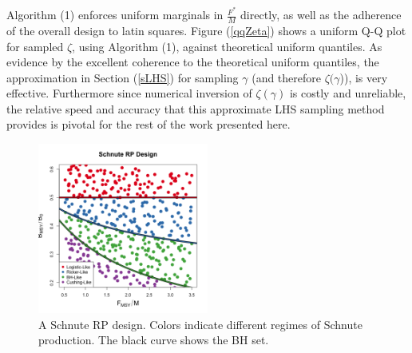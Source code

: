 %
Algorithm (1) enforces uniform marginals in $\frac{F^*}{M}$ directly, as well
as the adherence of the overall design to latin squares.
Figure (\ref{qqZeta}) shows a uniform Q-Q plot for sampled $\zeta$, using
Algorithm (1), against theoretical uniform quantiles. As evidence by the
excellent coherence to the theoretical uniform quantiles, the approximation
in Section (\ref{sLHS}) for sampling $\gamma$ (and therefore $\zeta(\gamma$)),
is very effective.
Furthermore since numerical inversion of $\zeta(\gamma)$ is costly and
unreliable, the relative speed and accuracy that this approximate LHS sampling
method provides is pivotal for the rest of the work presented here. %

%
\begin{figure}
\vspace{-0.5cm}
\includegraphics[width=0.5\textwidth]{../ddBias/designLineColorHHardFlatT30N150WWideN112.png}
\vspace{-1cm}
\caption{
A Schnute RP design. %
Colors indicate different regimes of Schnute production. %
The black curve shows the BH set.
}
\label{colorDes}
\end{figure}

